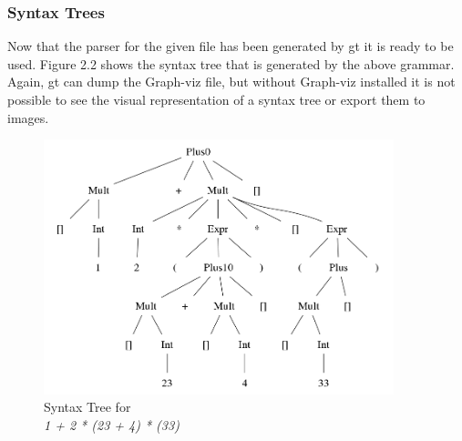 \subsubsection{Syntax Trees}

Now that the parser for the given file has been generated by gt it is ready to be used. 
Figure 2.2 shows the syntax tree that is generated by the above grammar. Again, gt
can dump the Graph-viz file, but without Graph-viz installed it is not possible to see
the visual representation of a syntax tree or export them to images.
%
%
\begin{figure}[h!]
  \centering
  \includegraphics[width=4in]{./examples/ebnf/simple/ebnf-simple.png}
  \caption{Syntax Tree for\\ \textit{1 + 2 * (23 + 4) * (33)}}
\end{figure}







